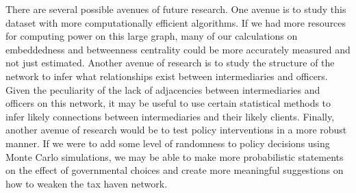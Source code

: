 \documentclass[11pt]{article}
\begin{document}
There are several possible avenues of future research. One avenue is to study
this dataset with more computationally efficient algorithms. If we had more
resources for computing power on this large graph, many of our calculations on
embeddedness and betweenness centrality could be more accurately measured and
not just estimated. Another avenue of research
is to study the structure of the network
to infer what relationships exist between intermediaries and officers. Given
the peculiarity of the lack of adjacencies between intermediaries and officers
on this network, it may be useful to use certain statistical methods to infer
likely connections between intermediaries and their likely clients. Finally,
another avenue of research would be to test policy interventions in a more
robust manner. If we were to add some level of randomness to policy
decisions using Monte Carlo simulations, we may be able to make more 
probabilistic statements on the effect of governmental choices and
create more meaningful suggestions on how to weaken the tax haven network.
\end{document}
